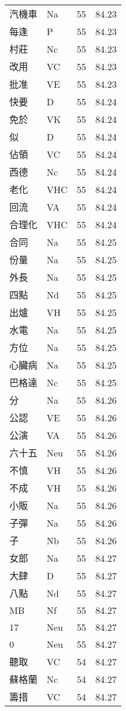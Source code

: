\documentclass[twocolumn]{book}
\begin{document}
\begin{supertabular}{llrr}
汽機車 & Na & 55 &  84.23\\
每逢 & P & 55 &  84.23\\
村莊 & Nc & 55 &  84.23\\
改用 & VC & 55 &  84.23\\
批准 & VE & 55 &  84.23\\
快要 & D & 55 &  84.24\\
免於 & VK & 55 &  84.24\\
似 & D & 55 &  84.24\\
佔領 & VC & 55 &  84.24\\
西德 & Nc & 55 &  84.24\\
老化 & VHC & 55 &  84.24\\
回流 & VA & 55 &  84.24\\
合理化 & VHC & 55 &  84.24\\
合同 & Na & 55 &  84.25\\
份量 & Na & 55 &  84.25\\
外長 & Na & 55 &  84.25\\
四點 & Nd & 55 &  84.25\\
出爐 & VH & 55 &  84.25\\
水電 & Na & 55 &  84.25\\
方位 & Na & 55 &  84.25\\
心臟病 & Na & 55 &  84.25\\
巴格達 & Nc & 55 &  84.25\\
分 & Na & 55 &  84.26\\
公認 & VE & 55 &  84.26\\
公演 & VA & 55 &  84.26\\
六十五 & Neu & 55 &  84.26\\
不慎 & VH & 55 &  84.26\\
不成 & VH & 55 &  84.26\\
小販 & Na & 55 &  84.26\\
子彈 & Na & 55 &  84.26\\
子 & Nb & 55 &  84.26\\
女郎 & Na & 55 &  84.27\\
大肆 & D & 55 &  84.27\\
八點 & Nd & 55 &  84.27\\
MB & Nf & 55 &  84.27\\
17 & Neu & 55 &  84.27\\
0 & Neu & 55 &  84.27\\
聽取 & VC & 54 &  84.27\\
蘇格蘭 & Nc & 54 &  84.27\\
籌措 & VC & 54 &  84.27\\

\end{supertabular}
\end{document}
